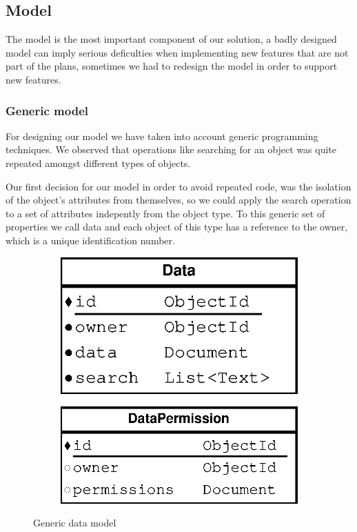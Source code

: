 \subsection{Model}
The model is the most important component of our solution, a badly designed model can imply serious deficulties when implementing new features that are not part of the plans, sometimes we had to redesign the model in order to support new features.

\subsubsection {Generic model}

For designing our model we have taken into account generic programming techniques. We observed that operations like searching for an object was quite repeated amongst different types of objects. 

Our first decision for our model in order to avoid repeated code, was the isolation of the object's attributes from themselves, so we could apply the search operation to a set of attributes indepently from the object type. To this generic set of properties we call data and each object of this type has a reference to the owner, which is a unique identification number.

\begin{figure}[H]
    \centering
    \begin{subfigure}[b]{0.3\textwidth}
    	\includegraphics[width=\textwidth]{figures/model_data}
    \end{subfigure}
    \begin{subfigure}[b]{0.35\textwidth}
    	\includegraphics[width=\textwidth]{figures/model_data_permission}
    \end{subfigure}
    \caption{Generic data model}
\end{figure} 

